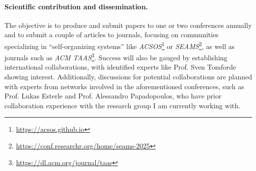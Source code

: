 \documentclass[12pt, a4paper]{article}
\begin{document}
\sloppypar
\paragraph{Scientific contribution and dissemination.}
The objective is to produce and submit papers to one or two conferences annually and to submit a couple of articles to journals,
focusing on communities specializing in ``self-organizing systems'' like \emph{ACSOS}\footnote{\url{https://acsos.github.io}} or \emph{SEAMS}\footnote{\url{https://conf.researchr.org/home/seams-2025}},
as well as journals such as \emph{ACM TAAS}\footnote{\url{https://dl.acm.org/journal/taas}}.
%
Success will also be gauged by establishing international collaborations, with identified experts like Prof. Sven Tomforde showing interest.
%
Additionally,
discussions for potential collaborations are planned with experts from networks involved in the aforementioned conferences,
such as Prof. Lukas Esterle and Prof. Alessandro Papadopoulos,
who have prior collaboration experience with the research group I am currently working with.



\end{document}
